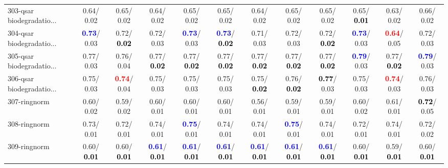 \begin{table}[h]
\begin{center}
{\begin{tabular}{lc|c|c|c|c|c|c|c|c|c|c}
303-qsar biodegradatio... &   0.64/  0.02 &   0.65/  0.02 &   0.64/  0.02 &   0.65/  0.02 &   0.65/  0.02 &   0.64/  0.02 &   0.65/  0.02 &   0.65/  0.02 &   0.65/\textcolor{black}{\textbf{  0.01}} &   0.63/  0.02 &   0.66/  0.02 \\
304-qsar biodegradatio... & \textcolor{blue}{\textbf{  0.73}}/  0.03 &   0.72/\textcolor{black}{\textbf{  0.02}} &   0.72/  0.03 & \textcolor{blue}{\textbf{  0.73}}/  0.03 & \textcolor{blue}{\textbf{  0.73}}/\textcolor{black}{\textbf{  0.02}} &   0.71/  0.03 &   0.72/  0.03 &   0.72/\textcolor{black}{\textbf{  0.02}} & \textcolor{blue}{\textbf{  0.73}}/  0.03 & \textcolor{red}{\textbf{  0.64}}/  0.05 &   0.72/  0.03 \\
305-qsar biodegradatio... &   0.77/  0.03 &   0.76/  0.04 &   0.77/\textcolor{black}{\textbf{  0.02}} &   0.77/\textcolor{black}{\textbf{  0.02}} &   0.77/\textcolor{black}{\textbf{  0.02}} &   0.77/\textcolor{black}{\textbf{  0.02}} &   0.77/\textcolor{black}{\textbf{  0.02}} &   0.77/\textcolor{black}{\textbf{  0.02}} & \textcolor{blue}{\textbf{  0.79}}/  0.03 &   0.77/\textcolor{black}{\textbf{  0.02}} & \textcolor{blue}{\textbf{  0.79}}/  0.03 \\
306-qsar biodegradatio... &   0.75/  0.03 & \textcolor{red}{\textbf{  0.74}}/  0.04 &   0.75/  0.03 &   0.75/  0.03 &   0.75/  0.03 &   0.75/\textcolor{black}{\textbf{  0.02}} &   0.76/\textcolor{black}{\textbf{  0.02}} & \textcolor{black}{\textbf{  0.77}}/  0.03 &   0.75/  0.03 & \textcolor{red}{\textbf{  0.74}}/  0.03 &   0.76/  0.03 \\
307-ringnorm &   0.60/  0.02 &   0.59/  0.02 &   0.60/  0.01 &   0.60/  0.01 &   0.60/  0.01 &   0.56/  0.01 &   0.59/  0.01 &   0.59/  0.01 &   0.60/  0.02 &   0.61/  0.01 & \textcolor{black}{\textbf{  0.72}}/  0.05 \\
308-ringnorm &   0.73/  0.01 &   0.72/  0.01 &   0.74/  0.01 & \textcolor{blue}{\textbf{  0.75}}/  0.01 &   0.74/  0.01 &   0.74/  0.01 & \textcolor{blue}{\textbf{  0.75}}/  0.01 &   0.74/  0.01 &   0.72/  0.01 &   0.74/  0.01 &   0.72/  0.02 \\
309-ringnorm &   0.60/\textcolor{black}{\textbf{  0.01}} &   0.60/\textcolor{black}{\textbf{  0.01}} & \textcolor{blue}{\textbf{  0.61}}/\textcolor{black}{\textbf{  0.01}} & \textcolor{blue}{\textbf{  0.61}}/\textcolor{black}{\textbf{  0.01}} & \textcolor{blue}{\textbf{  0.61}}/\textcolor{black}{\textbf{  0.01}} & \textcolor{blue}{\textbf{  0.61}}/\textcolor{black}{\textbf{  0.01}} & \textcolor{blue}{\textbf{  0.61}}/\textcolor{black}{\textbf{  0.01}} & \textcolor{blue}{\textbf{  0.61}}/\textcolor{black}{\textbf{  0.01}} &   0.60/\textcolor{black}{\textbf{  0.01}} &   0.59/\textcolor{black}{\textbf{  0.01}} &   0.60/\textcolor{black}{\textbf{  0.01}} \\ \hline

\end{tabular}}
\end{center}
\end{table}
